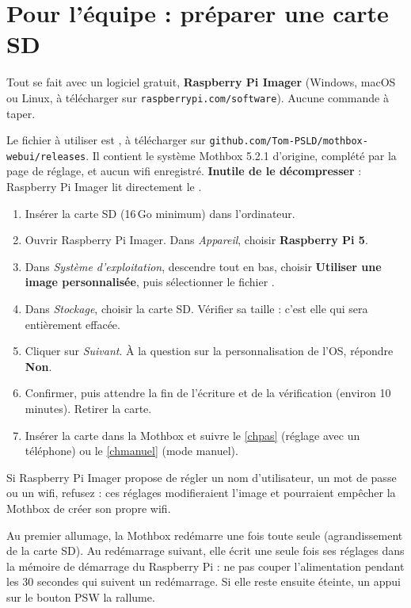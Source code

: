 \documentclass[11pt,a4paper,openany]{report}
\newcommand{\pasc}[2]{\tikz[baseline=(n.base)]\node[circle,fill=#1,text=white,font=\sffamily\bfseries\footnotesize,inner sep=1.5pt,minimum size=1.2em](n){#2};}
\newcommand{\pas}[1]{\pasc{pslrouge}{#1}}
\begin{document}
\chapter{Pour l'équipe : préparer une carte SD}

Tout se fait avec un logiciel gratuit, \textbf{Raspberry Pi Imager} (Windows, macOS ou Linux, à télécharger sur \texttt{raspberrypi.com/software}). Aucune commande à taper.

Le fichier à utiliser est , à télécharger sur \texttt{github.com/Tom-PSLD/mothbox-webui/releases}. Il contient le système Mothbox 5.2.1 d'origine, complété par la page de réglage, et aucun wifi enregistré. \textbf{Inutile de le décompresser} : Raspberry Pi Imager lit directement le .

\begin{enumerate}[label=\protect\pas{\arabic*},leftmargin=2.2em,itemsep=5pt]
  \item Insérer la carte SD (16\,Go minimum) dans l'ordinateur.
  \item Ouvrir Raspberry Pi Imager. Dans \emph{Appareil}, choisir \textbf{Raspberry Pi 5}.
  \item Dans \emph{Système d'exploitation}, descendre tout en bas, choisir \textbf{Utiliser une image personnalisée}, puis sélectionner le fichier .
  \item Dans \emph{Stockage}, choisir la carte SD. Vérifier sa taille : c'est elle qui sera entièrement effacée.
  \item Cliquer sur \emph{Suivant}. À la question sur la personnalisation de l'OS, répondre \textbf{Non}.
  \item Confirmer, puis attendre la fin de l'écriture et de la vérification (environ 10 minutes). Retirer la carte.
  \item Insérer la carte dans la Mothbox et suivre le \cref{chpas} (réglage avec un téléphone) ou le \cref{chmanuel} (mode manuel).
\end{enumerate}

\begin{attention}
Si Raspberry Pi Imager propose de régler un nom d'utilisateur, un mot de passe ou un wifi, refusez : ces réglages modifieraient l'image et pourraient empêcher la Mothbox de créer son propre wifi.
\end{attention}

\begin{attention}
Au premier allumage, la Mothbox redémarre une fois toute seule (agrandissement de la carte SD). Au redémarrage suivant, elle écrit une seule fois ses réglages dans la mémoire de démarrage du Raspberry Pi : ne pas couper l'alimentation pendant les 30 secondes qui suivent un redémarrage. Si elle reste ensuite éteinte, un appui sur le bouton PSW la rallume.
\end{attention}
\end{document}
